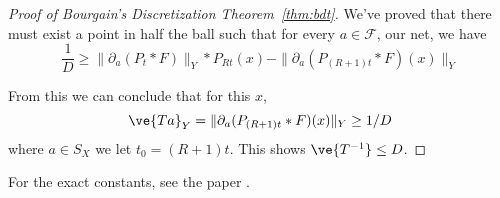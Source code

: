 \begin{proof}[Proof of Bourgain's Discretization Theorem~\ref{thm:bdt}]

We've proved that there must exist a point in half the ball such that for every $a \in \mathcal{F}$, our net, we have
\[
\frac{1}{D} \geq \|\partial_a(P_t *F)\|_{Y} * P_{Rt}(x) - \|\partial_a(P_{(R + 1)t}*F)(x)\|_Y
\]

From this we can conclude that for this $x$,
\[
\ve{Ta}_Y=\|\partial_a(P_{(R + 1)t} * F)(x)\|_Y \ge 1/D
\]
where $a\in S_X$ we let $t_0=(R+1)t$. This shows $\ve{T^{-1}}\le D$.
\end{proof}
For the exact constants, see the paper .


%

